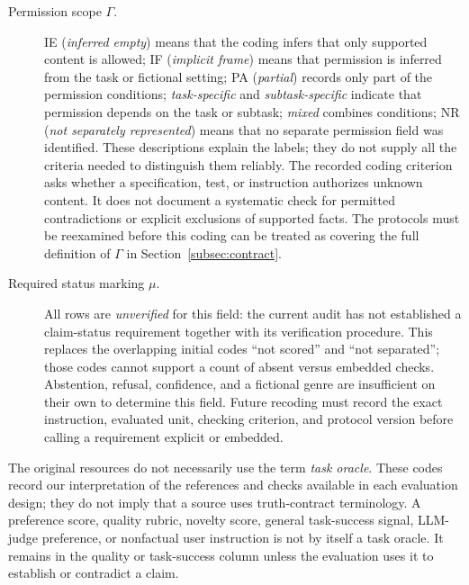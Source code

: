 \documentclass{clv2025}
\begin{document}
\begin{description}
  \item[Permission scope $\Gamma$.]
  IE (\emph{inferred empty}) means that the coding infers that only supported
  content is allowed;
  IF (\emph{implicit frame}) means that permission is inferred from the task or
  fictional setting;
  PA (\emph{partial}) records only part of the permission conditions;
  \emph{task-specific} and \emph{subtask-specific} indicate that permission
  depends on the task or subtask;
  \emph{mixed} combines conditions;
  NR (\emph{not separately represented}) means that no separate permission field
  was identified.
  These descriptions explain the labels; they do not supply all the criteria
  needed to distinguish them reliably. The recorded coding criterion asks
  whether a specification, test, or instruction authorizes unknown content.
  It does not document a systematic check for permitted contradictions or
  explicit exclusions of supported facts. The protocols must be reexamined
  before this coding can be treated as covering the full definition of
  $\Gamma$ in Section~\ref{subsec:contract}.

  \item[Required status marking $\mu$.]
  All rows are \emph{unverified} for this field: the current audit has not
  established a claim-status requirement together with its verification
  procedure. This replaces the overlapping initial codes ``not scored''
  and ``not separated''; those codes cannot support a count of absent versus
  embedded checks. Abstention, refusal, confidence, and a fictional genre
  are insufficient on their own to determine this field. Future recoding
  must record the exact instruction, evaluated unit, checking criterion,
  and protocol version before calling a requirement explicit or embedded.
\end{description}

The original resources do not necessarily use the term \emph{task oracle}.
These codes record our interpretation of the references and checks
available in each evaluation design; they do not imply that a source uses
truth-contract terminology.
A preference score, quality rubric, novelty score, general task-success
signal, LLM-judge preference, or nonfactual user instruction is not by itself
a task oracle.
It remains in the quality or task-success column unless the evaluation uses it
to establish or contradict a claim.
\end{document}
